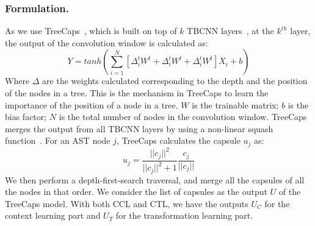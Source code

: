 \subsubsection*{\bf Formulation.}
As we use TreeCaps~\cite{bui2021treecaps}, which is built on top of
$k$ TBCNN layers~\cite{mou2014tbcnn}, at the $k^{th}$ layer, the
output of the convolution window is calculated as:
\begin{equation}\label{eq:treecaps}
	Y = tanh(\sum_{i=1}^{N}[\Delta^t_iW^t + \Delta^t_iW^t + \Delta^t_iW^t]X_i + b)
\end{equation}
Where $\Delta$ are the weights calculated corresponding to the depth
and the position of the nodes in a tree. This is the mechanism in
TreeCaps to learn the importance of the position of a node in a
tree. $W$ is the trainable matrix; $b$ is the bias factor; $N$ is the
total number of nodes in the convolution window. TreeCaps merges the
output from all TBCNN layers by using a non-linear squash
function~\cite{sabour2017dynamic}. For an AST node $j$, TreeCaps
calculates the capsule $u_j$ as:
\begin{equation}\label{eq:2}
	u_j = \frac{||c_j||^2}{||c_j||^2+1}\frac{c_j}{||c_j||}
\end{equation}
We then perform a depth-first-search traversal, and merge all the
capsules of all the nodes in that order. We consider the list of
capsules as the output $U$ of the TreeCaps model. With both
CCL and CTL, we have the outputs $U_C$ for the context
learning part and $U_T$ for the transformation learning part.

